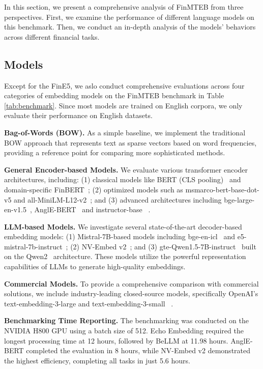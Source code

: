 
In this section, we present a comprehensive analysis of FinMTEB from three perspectives. 
First, we examine the performance of different language models on this benchmark. Then, we conduct an in-depth analysis of the models' behaviors across different financial tasks. 

\label{tab:benchmark}
\begin{center}
    
\end{center}


\subsection{Models}
Except for the FinE5, we aslo conduct comprehensive evaluations across four categories of embedding models on the FinMTEB benchmark in Table \ref{tab:benchmark}. Since most models are trained on English corpora, we only evaluate their performance on English datasets. 

\textbf{Bag-of-Words (BOW).} As a simple baseline, we implement the traditional BOW approach that represents text as sparse vectors based on word frequencies, providing a reference point for comparing more sophisticated methods.

\textbf{General Encoder-based Models.} We evaluate various transformer encoder architectures, including: (1) classical models like BERT (CLS pooling)~\citep{Bert} and domain-specific FinBERT~\citep{finbert}; (2) optimized models such as msmarco-bert-base-dot-v5 and all-MiniLM-L12-v2~\citep{sentence-bert}; and (3) advanced architectures including bge-large-en-v1.5~\citep{bge_embedding}, AnglE-BERT~\citep{li2023angle} and instructor-base ~\citep{instructor}.

\textbf{LLM-based Models.} We investigate several state-of-the-art decoder-based embedding models: (1) Mistral-7B-based models including bge-en-icl~\citep{bge_embedding} and e5-mistral-7b-instruct~\citep{e5}; (2) NV-Embed v2~\citep{NV-Embed}; and (3) gte-Qwen1.5-7B-instruct~\citep{gte} built on the Qwen2~\citep{qwen2} architecture. These models utilize the powerful representation capabilities of LLMs to generate high-quality embeddings.



\textbf{Commercial Models.} To provide a comprehensive comparison with commercial solutions, we include industry-leading closed-source models, specifically OpenAI's text-embedding-3-large and text-embedding-3-small ~\citep{openai_embedding}.

\textbf{Benchmarking Time Reporting.} The benchmarking was conducted on the NVIDIA H800 GPU using a batch size of 512. Echo Embedding required the longest processing time at 12 hours, followed by BeLLM at 11.98 hours. AnglE-BERT completed the evaluation in 8 hours, while NV-Embed v2 demonstrated the highest efficiency, completing all tasks in just 5.6 hours. 


